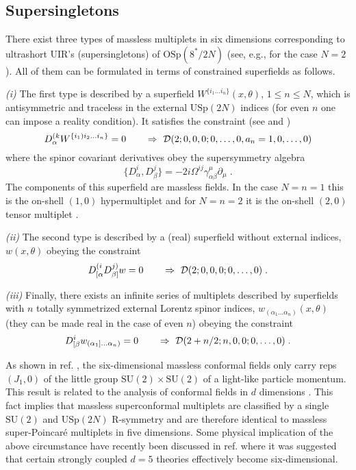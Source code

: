 \documentclass[a4paper,12pt]{article}
\begin{document}
 
\subsection{Supersingletons}

There exist three types of massless multiplets in six dimensions 
corresponding to ultrashort UIR's (supersingletons) of 
$\mbox{OSp}(8^*/2N)$ (see, e.g., \cite{GT} for the case $N=2$). 
All of them can be formulated in terms of constrained superfields 
as follows. 


{\sl (i)} The first type is described by a superfield 
$W^{\{i_1\ldots i_n\}}(x,\theta)$, $1\leq n \leq N$, which is 
antisymmetric and traceless in the external $\mbox{USp}(2N)$ 
indices (for even $n$ one can impose a reality condition). It 
satisfies the constraint (see \cite{HSiT} and \cite{Park}) 
\begin{equation}\label{6.19}
  D^{(k}_\alpha W^{\{i_1)i_2\ldots i_n\}}=0 \qquad \Rightarrow \ {\cal 
D}(2;0,0,0;0,\ldots,0,a_{n}=1,0,\ldots,0) 
\end{equation}
where the spinor covariant derivatives obey the supersymmetry 
algebra 
\begin{equation}\label{6.21}
  \{ D^i_\alpha, D^j_\beta\} = 
-2i\Omega^{ij}\gamma^\mu_{\alpha\beta}\partial_\mu\;. 
\end{equation}
The components of this superfield are massless fields. In the case 
$N=n=1$ this is the on-shell $(1,0)$ hypermultiplet and for 
$N=n=2$ it is the on-shell $(2,0)$ tensor multiplet 
\cite{HSiT,bsvp}.  

{\sl (ii)} The second type is described by a (real) superfield 
without external indices, $w(x,\theta)$ obeying the constraint 
\begin{equation}\label{6.23}
 D^{(i}_{[\alpha} D^{j)}_{\beta]} w = 0 \qquad \Rightarrow \ {\cal 
D}(2;0,0,0;0,\ldots,0)\;.
\end{equation}

{\sl (iii)} Finally, there exists an infinite series of 
multiplets described by superfields with $n$ totally symmetrized 
external Lorentz spinor indices, 
$w_{(\alpha_1\ldots\alpha_n)}(x,\theta)$ (they can be made real 
in the case of even $n$) obeying the constraint
\begin{equation}\label{6.24}
  D^i_{[\beta}w_{(\alpha_1]\ldots\alpha_n)} = 0 \qquad \Rightarrow \ {\cal 
D}(2+n/2;n,0,0;0,\ldots,0)\;. 
\end{equation}

As shown in ref. \cite{FS3}, the six-dimensional massless 
conformal fields only carry reps $(J_1,0)$ of the little group 
$\mbox{SU}(2)\times \mbox{SU}(2)$ of a light-like particle 
momentum. This result is related to the analysis of conformal 
fields in $d$ dimensions \cite{Siegel1,AL}. This fact implies 
that massless superconformal multiplets are classified by a 
single $\mbox{SU}(2)$ and $\mbox{USp}(2N)$ R-symmetry and are 
therefore identical to massless super-Poincar\'e multiplets in 
five dimensions. Some physical implication of the above 
circumstance have recently been discussed in ref. \cite{HULL2} 
where it was suggested that certain strongly coupled $d=5$ 
theories effectively become six-dimensional. 
\end{document}
